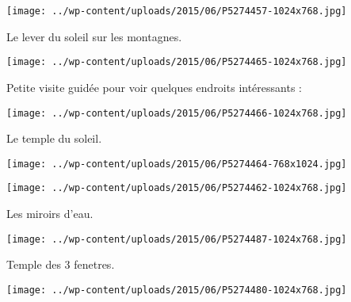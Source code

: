  

 

\begin{center} \texttt{[image: ../wp-content/uploads/2015/06/P5274457-1024x768.jpg]} \end{center}

 

 Le lever du soleil sur les montagnes. 

 

\begin{center} \texttt{[image: ../wp-content/uploads/2015/06/P5274465-1024x768.jpg]} \end{center}

 

 Petite visite guidée pour voir quelques endroits intéressants : 

 

\begin{center} \texttt{[image: ../wp-content/uploads/2015/06/P5274466-1024x768.jpg]} \end{center}

 

 Le temple du soleil. 

 

\begin{center} \texttt{[image: ../wp-content/uploads/2015/06/P5274464-768x1024.jpg]} \end{center}

 

 

\begin{center} \texttt{[image: ../wp-content/uploads/2015/06/P5274462-1024x768.jpg]} \end{center}

 

 Les miroirs d'eau. 

 

\begin{center} \texttt{[image: ../wp-content/uploads/2015/06/P5274487-1024x768.jpg]} \end{center}

 

 Temple des 3 fenetres. 

 

\begin{center} \texttt{[image: ../wp-content/uploads/2015/06/P5274480-1024x768.jpg]} \end{center}

